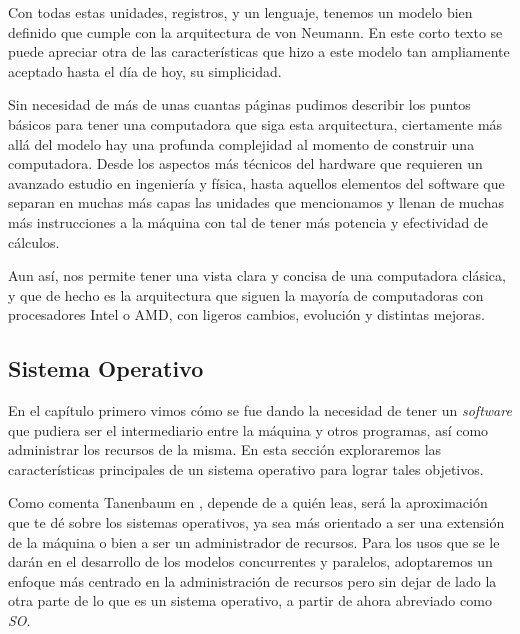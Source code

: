 \documentclass[letterpaper,12pt,oneside]{book}
\begin{document}
		Con todas estas unidades, registros, y un lenguaje, tenemos un modelo bien definido que cumple con la arquitectura de von Neumann. En este corto 
		texto se puede apreciar otra de las características que hizo a este modelo tan ampliamente aceptado hasta el día de hoy, su simplicidad.
  
        Sin 
		necesidad
		de más de unas cuantas páginas pudimos describir los puntos básicos para tener una computadora que siga esta arquitectura, ciertamente más allá
		del modelo hay una profunda complejidad al momento de construir una computadora. Desde los aspectos más técnicos del hardware que requieren
		un avanzado estudio en ingeniería y física, hasta aquellos elementos del software que separan en muchas más capas las unidades que mencionamos
		y llenan de muchas más instrucciones a la máquina con tal de tener más potencia y efectividad de cálculos\cite{tanenbaum_structured_2013}.
  
        Aun así, nos permite
		tener una vista clara y concisa de una computadora clásica, y que de hecho es la arquitectura que siguen la mayoría de computadoras con
		procesadores Intel o AMD, con ligeros cambios, evolución y distintas mejoras.
		
		\subsection{Sistema Operativo}   
		
		En el capítulo primero vimos cómo se fue dando la necesidad de tener un \textit{software} que pudiera ser el intermediario entre la máquina
		y otros programas, así como administrar los recursos de la misma. En esta sección exploraremos las características principales
		de un sistema operativo para lograr tales objetivos.
		
		Como comenta Tanenbaum en \cite{tanenbaum_modern_2002}, depende de a quién leas, será la aproximación que te dé sobre los sistemas operativos,
		ya sea más orientado a ser una extensión de la máquina o bien a ser un administrador de recursos. Para los usos que se le darán en el desarrollo
		de los modelos concurrentes y paralelos, adoptaremos un enfoque más centrado en la administración de recursos pero sin dejar de lado
		la otra parte de lo que es un sistema operativo, a partir de ahora abreviado como \textit{SO}.
		
\end{document}
